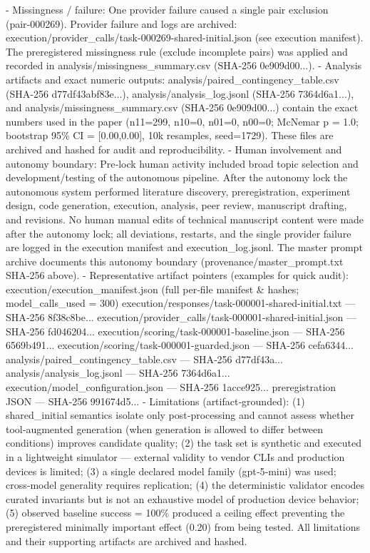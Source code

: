 \documentclass[conference]{IEEEtran}
\begin{document}
- Missingness / failure: One provider failure caused a single pair exclusion (pair‑000269). Provider failure and logs are archived: execution/provider\_calls/task-000269-shared-initial.json (see execution manifest). The preregistered missingness rule (exclude incomplete pairs) was applied and recorded in analysis/missingness\_summary.csv (SHA‑256 0e909d00...).
- Analysis artifacts and exact numeric outputs: analysis/paired\_contingency\_table.csv (SHA‑256 d77df43abf83e...), analysis/analysis\_log.jsonl (SHA‑256 7364d6a1...), and analysis/missingness\_summary.csv (SHA‑256 0e909d00...) contain the exact numbers used in the paper (n11=299, n10=0, n01=0, n00=0; McNemar p = 1.0; bootstrap 95\% CI = [0.00,0.00], 10k resamples, seed=1729). These files are archived and hashed for audit and reproducibility.
- Human involvement and autonomy boundary: Pre‑lock human activity included broad topic selection and development/testing of the autonomous pipeline. After the autonomy lock the autonomous system performed literature discovery, preregistration, experiment design, code generation, execution, analysis, peer review, manuscript drafting, and revisions. No human manual edits of technical manuscript content were made after the autonomy lock; all deviations, restarts, and the single provider failure are logged in the execution manifest and execution\_log.jsonl. The master prompt archive documents this autonomy boundary (provenance/master\_prompt.txt SHA‑256 above).
- Representative artifact pointers (examples for quick audit):
  \textbullet{} execution/execution\_manifest.json (full per‑file manifest \& hashes; model\_calls\_used = 300)
  \textbullet{} execution/responses/task-000001-shared-initial.txt --- SHA‑256 8f38c8be...
  \textbullet{} execution/provider\_calls/task-000001-shared-initial.json --- SHA‑256 fd046204...
  \textbullet{} execution/scoring/task-000001-baseline.json --- SHA‑256 6569b491...
  \textbullet{} execution/scoring/task-000001-guarded.json --- SHA‑256 cefa6344...
  \textbullet{} analysis/paired\_contingency\_table.csv --- SHA‑256 d77df43a...
  \textbullet{} analysis/analysis\_log.jsonl --- SHA‑256 7364d6a1...
  \textbullet{} execution/model\_configuration.json --- SHA‑256 1acce925...
  \textbullet{} preregistration JSON --- SHA‑256 991674d5...
- Limitations (artifact‑grounded): (1) shared\_initial semantics isolate only post‑processing and cannot assess whether tool‑augmented generation (when generation is allowed to differ between conditions) improves candidate quality; (2) the task set is synthetic and executed in a lightweight simulator --- external validity to vendor CLIs and production devices is limited; (3) a single declared model family (gpt‑5‑mini) was used; cross‑model generality requires replication; (4) the deterministic validator encodes curated invariants but is not an exhaustive model of production device behavior; (5) observed baseline success = 100\% produced a ceiling effect preventing the preregistered minimally important effect (0.20) from being tested. All limitations and their supporting artifacts are archived and hashed.
\end{document}
